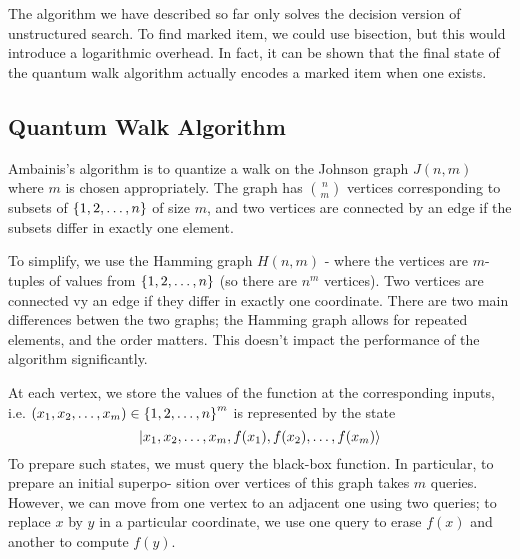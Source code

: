 The algorithm we have described so far only solves the decision version of unstructured search. To find marked item, we could use bisection, but this would introduce a logarithmic overhead. In fact, it can be shown that the final state of the quantum walk algorithm actually encodes a marked item when one exists.

\subsection*{Quantum Walk Algorithm}
Ambainis’s algorithm is to quantize a walk on the Johnson graph $J(n, m)$ where $m$ is chosen appropriately. The graph has $\binom{n}{m}$ vertices corresponding to subsets of $\set{1, 2, \ldots, n}$ of size $m$, and two vertices are connected by an edge if the subsets differ in exactly one element.

To simplify, we use the Hamming graph $H(n, m)$ - where the vertices are $m$-tuples of values from $\set{1, 2, \ldots, n}$ (so there are $n^m$ vertices). Two vertices are connected vy an edge if they differ in exactly one coordinate. There are two main differences betwen the two graphs; the Hamming graph allows for repeated elements, and the order matters. This doesn't impact the performance of the algorithm significantly.

At each vertex, we store the values of the function at the corresponding inputs, i.e. $(x_1, x_2, \ldots, x_m) \in \set{1, 2, \ldots, n}^m$ is represented by the state
\begin{equation}
    \lvert x_1, x_2, \ldots, x_m, f(x_1), f(x_2), \ldots, f(x_m) \rangle
\end{equation}
To prepare such states, we must query the black-box function. In particular, to prepare an initial superpo- sition over vertices of this graph takes $m$ queries. However, we can move from one vertex to an adjacent one using two queries; to replace $x$ by $y$ in a particular coordinate, we use one query to erase $f(x)$ and another to compute $f(y)$.

